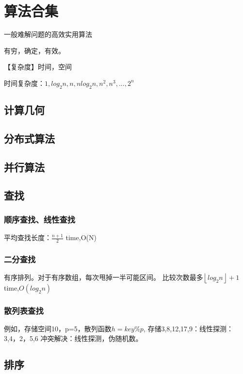 \documentclass[UTF8]{../computerUniverse}
\begin{document}
\chapter{算法合集}
一般难解问题的高效实用算法

有穷，确定，有效。

【复杂度】时间，空间

时间复杂度：$1,log_2n,n,nlog_2n,n^2,n^3,...,2^n$




\section{计算几何}

\section{分布式算法}
\section{并行算法}





\section{查找}


\subsection{顺序查找、线性查找}
平均查找长度：$\frac{n+1}{2}$
time,O(N)


\subsection{二分查找}
有序排列。对于有序数组，每次甩掉一半可能区间。
比较次数最多$\left\lfloor log_2n\right\rfloor +1$
time,$O(log_2n)$


\subsection{散列表查找}
例如，存储空间10，p=5，散列函数$h=key\%p$,
存储3,8,12,17,9：线性探测： 3,4，2，5,6
冲突解决：线性探测，伪随机数。



\section{排序}
\end{document}

